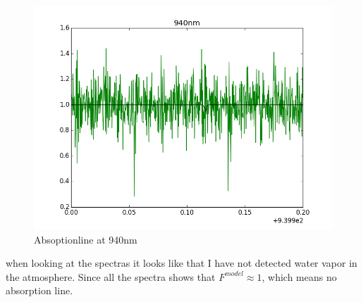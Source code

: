 \documentclass[a4paper,11pt,english]{report}
\begin{document}
\begin{figure}[!htb]
  \includegraphics[scale = 0.33]{940nm.png}
  \caption{Absoptionline at 940nm}
  \endminipage
\end{figure}
when looking
at the spectras it looks like that I have not detected water vapor in the
atmosphere. Since all the spectra shows that \(F^{model} \approx 1\), which
means no absorption line.
\end{document}
